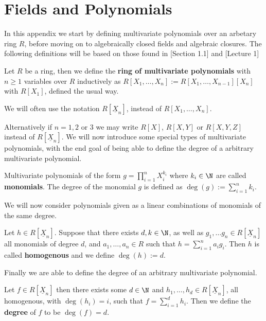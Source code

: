 \chapter{Fields and Polynomials}
In this appendix we start by defining multivariate polynomials over an arbetary ring $R$, before moving on to algebraically closed fields and algebraic closures.
The following definitions will be based on those found in \cite{Fulton}[Section 1.1] and \cite{alg_geom_lec}[Lecture 1]
\begin{definition}
  Let $R$ be a ring, then we define the \textbf{ring of multivariate polynomials} with $n \geq 1$ variables over $R$ inductively as $R[X_{1}, \ldots, X_{n}] := R[X_{1}, \ldots, X_{n - 1}][X_{n}]$ with $R[X_{1}]$, defined the usual way.
\end{definition}
\begin{remark}
  We will often use the notation $R[\underline{X}_{n}]$, instead of $R[X_{1}, \ldots, X_{n}]$.
\end{remark}
Alternatively if $n = 1, 2$ or $3$ we may write $R[X]$, $R[X, Y]$ or $R[X, Y, Z]$ instead of $R[\underline{X}_{n}]$.
We will now introduce some special types of multivariate polynomials, with the end goal of being able to define the degree of a arbitrary multivariate polynomial.
\begin{definition}\label{def:monomial}
  Multivariate polynomials of the form $g = \prod_{i = 1}^{n} X_{i}^{k_{i}}$ where $k_{i} \in \N$ are called \textbf{monomials}. The degree of the monomial $g$ is defined  as $\deg(g) := \sum^{n}_{i = 1} k_{i}$.
\end{definition}
We will now consider polynomials given as a linear combinations of monomials of the same degree.
\begin{definition}\label{def:homogenous_poly}
  Let $h \in R[\underline{X}_{n}]$. Suppose that there exists $d, k \in \N$, as well as $g_1, \ldots g_{n} \in R[\underline{X}_{n}]$ all monomials of degree $d$, and $a_{1}, \ldots, a_{n} \in R$ such that $h = \sum^{n}_{i = 1} a_{i} g_{i}$. Then $h$ is called \textbf{homogenous} and we define $\deg(h) := d$.
\end{definition}
Finally we are able to define the degree of an arbitrary multivariate polynomial.
\begin{definition}\label{def:degree}
  Let $f \in R[\underline{X}_{n}]$ then there exists some $d \in \N$ and $h_{1}, \ldots, h_{d} \in R[\underline{X}_{n}]$, all homogenous, with $\deg(h_{i}) = i$, such that $f = \sum^{d}_{i = 1} h_{i}$.
  Then we define the \textbf{degree} of $f$ to be $\deg(f) = d$.
\end{definition}
